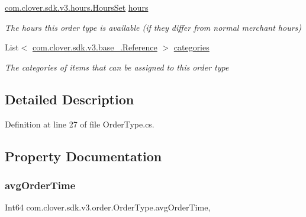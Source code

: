 \begin{DoxyCompactItemize}
\hyperlink{classcom_1_1clover_1_1sdk_1_1v3_1_1hours_1_1_hours_set}{com.\+clover.\+sdk.\+v3.\+hours.\+Hours\+Set} \hyperlink{classcom_1_1clover_1_1sdk_1_1v3_1_1order_1_1_order_type_a0ac9ba81322329c556351e8b819e9475}{hours}
\begin{DoxyCompactList}\small\item\em The hours this order type is available (if they differ from normal merchant hours) \end{DoxyCompactList}\item 
List$<$ \hyperlink{classcom_1_1clover_1_1sdk_1_1v3_1_1base___1_1_reference}{com.\+clover.\+sdk.\+v3.\+base\+\_\+.\+Reference} $>$ \hyperlink{classcom_1_1clover_1_1sdk_1_1v3_1_1order_1_1_order_type_a53f9c84cac095eb9b387d90ce38e7a79}{categories}
\begin{DoxyCompactList}\small\item\em The categories of items that can be assigned to this order type \end{DoxyCompactList}\end{DoxyCompactItemize}


\subsection{Detailed Description}


Definition at line 27 of file Order\+Type.\+cs.



\subsection{Property Documentation}
\mbox{\label{classcom_1_1clover_1_1sdk_1_1v3_1_1order_1_1_order_type_a8e608366a9f8370cc4f9439a1f2561cd}} 
\subsubsection{\texorpdfstring{avg\+Order\+Time}{avgOrderTime}}
{\footnotesize\ttfamily Int64 com.\+clover.\+sdk.\+v3.\+order.\+Order\+Type.\+avg\+Order\+Time\hspace{0.3cm}{\ttfamily [get]}, {\ttfamily [set]}}



